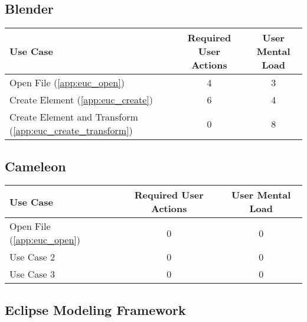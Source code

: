 \subsection*{Blender}




\begin{tabularx}{\textwidth}{Xcc}
\textbf{Use Case} & \textbf{Required User Actions} & \textbf{User Mental Load}\\
\hline
Open File (\ref{app:euc_open})        & 4 & 3 \\
Create Element (\ref{app:euc_create}) & 6 & 4 \\
Create Element and Transform (\ref{app:euc_create_transform}) & 0 & 8
\end{tabularx}

\subsection*{Cameleon}

\begin{tabularx}{\textwidth}{Xcc}
\textbf{Use Case} & \textbf{Required User Actions} & \textbf{User Mental Load}\\
\hline
Open File (\ref{app:euc_open}) & 0 & 0 \\
Use Case 2                     & 0 & 0 \\
Use Case 3                     & 0 & 0
\end{tabularx}

\subsection*{Eclipse Modeling Framework}

